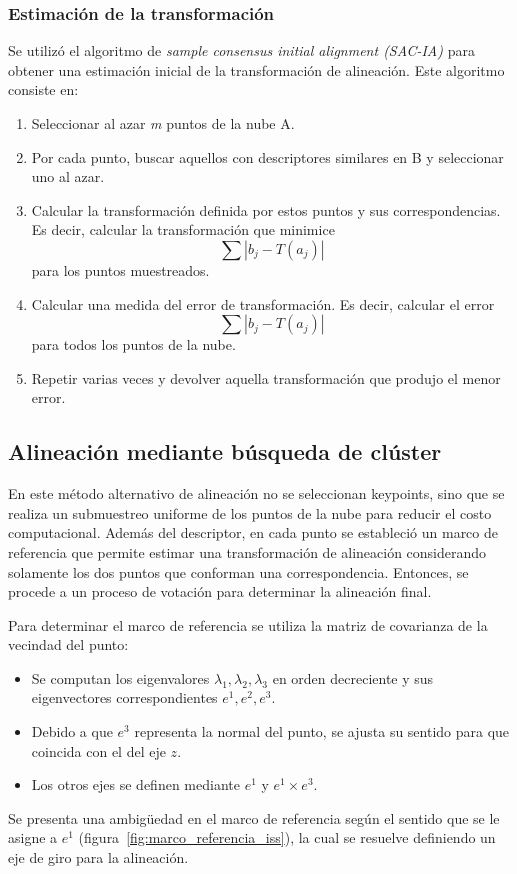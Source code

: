 		\subsubsection{Estimación de la transformación}
			Se utilizó el algoritmo de \emph{sample consensus initial alignment
			(SAC-IA)} para obtener una estimación inicial de la transformación de alineación.
			Este algoritmo consiste en:
			\begin{enumerate}
				\item Seleccionar al azar \emph{m} puntos de la nube A.
				\item Por cada punto, buscar aquellos con descriptores similares en B y seleccionar uno al azar.
				\item Calcular la transformación definida por estos puntos y sus correspondencias.
					Es decir, calcular la transformación que minimice
					\[ \sum |b_j - T(a_j)| \]
					para los puntos muestreados.
				\item Calcular una medida del error de transformación.
					Es decir, calcular el error
					\[ \sum |b_j - T(a_j)| \]
					para todos los puntos de la nube.
				\item Repetir varias veces y devolver aquella transformación que produjo el menor error.\cite{Rusu:2009:FPF:1703435.1703733}
			\end{enumerate}


	\subsection{Alineación mediante búsqueda de clúster}
		En este método alternativo de alineación no se seleccionan keypoints,
		sino que se realiza un submuestreo uniforme de los puntos de la nube
		para reducir el costo computacional.
		Además del descriptor, en cada punto se estableció un marco de referencia
		que permite estimar una transformación de alineación
		considerando solamente los dos puntos que conforman una correspondencia\cite{ISS}.
		Entonces, se procede a un proceso de votación para determinar la alineación final.

		Para determinar el marco de referencia se utiliza la matriz de covarianza de la vecindad del punto:
		\begin{itemize}
			\item Se computan los eigenvalores ${\lambda_1, \lambda_2, \lambda_3}$ en orden decreciente y sus eigenvectores correspondientes
				$e^{1}, e^{2}, e^{3}$.
			\item Debido a que $e^{3}$ representa la normal del punto, se ajusta su sentido para que coincida con el del eje $z$.
			\item Los otros ejes se definen mediante $e^{1}$ y $e^{1} \times e^{3}$.
		\end{itemize}
		Se presenta una ambigüedad en el marco de referencia según el sentido que se le asigne a $e^{1}$ (figura~\ref{fig:marco_referencia_iss}),
		la cual se resuelve definiendo un eje de giro para la alineación.

